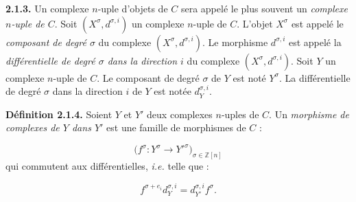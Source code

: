 \noindent\textbf{2.1.3.}\quad
Un complexe $n$-uple d'objets de $C$ sera appelé le plus souvent un
\emph{complexe $n$-uple de $C$}. Soit $(X^\sigma,d^{\sigma,i})$ un
complexe $n$-uple de $C$.
L'objet $X^\sigma$ est appelé le \emph{composant de degré $\sigma$} du
complexe $(X^\sigma,d^{\sigma,i})$.
Le morphisme $d^{\sigma,i}$ est appelé la \emph{différentielle de degré
$\sigma$ dans la direction $i$} du complexe
$(X^\sigma,d^{\sigma,i})$.
Soit $Y$ un complexe $n$-uple de $C$. Le composant de degré $\sigma$ de
$Y$ est noté $Y^\sigma$. La différentielle de degré $\sigma$ dans la
direction $i$ de $Y$ est notée $d_Y^{\sigma,i}$.

\noindent\textbf{Définition 2.1.4.}\quad
Soient $Y$ et $Y'$ deux complexes $n$-uples de $C$. Un \emph{morphisme
de complexes de $Y$ dans $Y'$} est une famille de morphismes de $C$ :

\begin{equation*}
  \bigl(f^\sigma\colon Y^\sigma\longrightarrow Y'^{\sigma}\bigr)_{
    \sigma\in\mathbb Z[n]}
\end{equation*}
qui commutent aux différentielles, \emph{i.e.} telle que :

\begin{equation}
  f^{\sigma+e_i}d_Y^{\sigma,i}
  =d_{Y'}^{\sigma,i}f^\sigma.
  \tag{2.1.4.1}
\end{equation}
